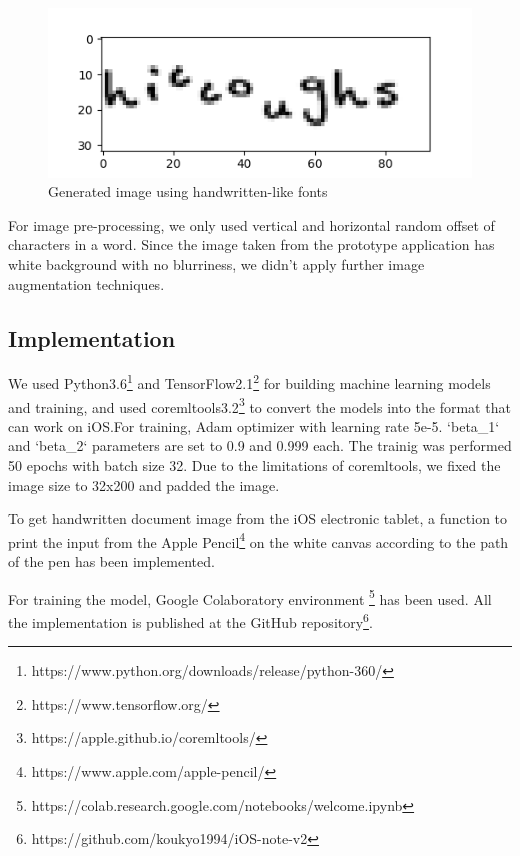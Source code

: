 \begin{figure}
    \centering
    \includegraphics[width=\linewidth]{images/generated_image.png}
    \caption{Generated image using handwritten-like fonts}
    \label{fig:generated_image}
\end{figure}

For image pre-processing, we only used vertical and horizontal random offset of characters in a word.
Since the image taken from the prototype application has white background with no blurriness,
we didn't apply further image augmentation techniques.

\subsection{Implementation}

We used Python3.6\footnote{https://www.python.org/downloads/release/python-360/} and
TensorFlow2.1\footnote{https://www.tensorflow.org/} for building machine learning
models and training, and used coremltools3.2\footnote{https://apple.github.io/coremltools/}
to convert the models into the format that can work on iOS.For training,
Adam optimizer with learning rate 5e-5. `beta\_1` and `beta\_2` parameters are set to 0.9 and 0.999 each.
The trainig was performed 50 epochs with batch size 32. Due to the limitations of coremltools,
we fixed the image size to 32x200 and padded the image.

To get handwritten document image from the iOS electronic tablet, a function to print
the input from the Apple Pencil\footnote{https://www.apple.com/apple-pencil/} on the white canvas
according to the path of the pen has been implemented.

For training the model, Google Colaboratory environment
\footnote{https://colab.research.google.com/notebooks/welcome.ipynb} has been used.
All the implementation is published at the GitHub repository\footnote{https://github.com/koukyo1994/iOS-note-v2}.
